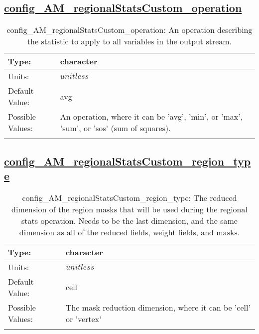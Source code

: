 \subsection[config\_AM\_regionalStatsCustom\_operation]{\hyperref[sec:nm_tab_AM_regionalStatsCustom]{config\_AM\_regionalStatsCustom\_operation}}
\label{subsec:nm_sec_config_AM_regionalStatsCustom_operation}
\begin{center}
\begin{longtable}{| p{2.0in} || p{4.0in} |}
    \hline
    Type: & character \\
    \hline
    Units: & $unitless$ \\
    \hline
    Default Value: & avg \\
    \hline
    Possible Values: & An operation, where it can be 'avg', 'min', or 'max', 'sum', or 'sos' (sum of squares). \\
    \hline
    \caption{config\_AM\_regionalStatsCustom\_operation: An operation describing the statistic to apply to all variables in the output stream.}
\end{longtable}
\end{center}
\subsection[config\_AM\_regionalStatsCustom\_region\_type]{\hyperref[sec:nm_tab_AM_regionalStatsCustom]{config\_AM\_regionalStatsCustom\_region\_type}}
\label{subsec:nm_sec_config_AM_regionalStatsCustom_region_type}
\begin{center}
\begin{longtable}{| p{2.0in} || p{4.0in} |}
    \hline
    Type: & character \\
    \hline
    Units: & $unitless$ \\
    \hline
    Default Value: & cell \\
    \hline
    Possible Values: & The mask reduction dimension, where it can be 'cell' or 'vertex' \\
    \hline
    \caption{config\_AM\_regionalStatsCustom\_region\_type: The reduced dimension of the region masks that will be used during the regional stats operation. Needs to be the last dimension, and the same dimension as all of the reduced fields, weight fields, and masks.}
\end{longtable}
\end{center}
